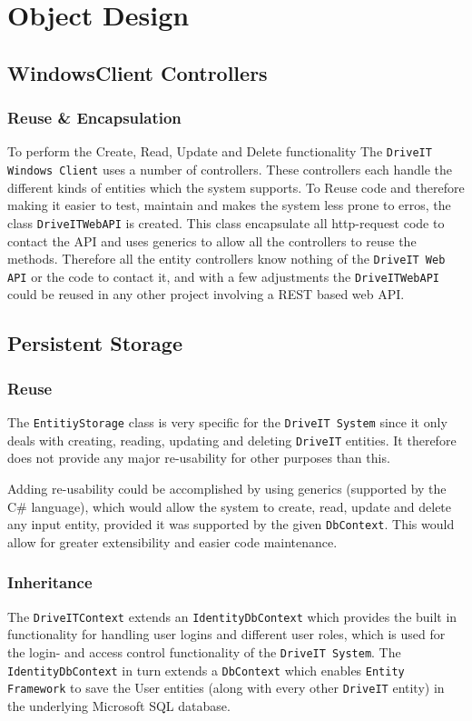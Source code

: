 \section{Object Design}
\subsection{WindowsClient Controllers}
\subsubsection{Reuse \& Encapsulation}
To perform the Create, Read, Update and Delete functionality The \texttt{DriveIT Windows Client} uses a number of controllers. These controllers each handle the different kinds of entities which the system supports. To Reuse code and therefore making it easier to test, maintain and makes the system less prone to erros, the class \texttt{DriveITWebAPI} is created. This class encapsulate all http-request code to contact the API and uses generics to allow all the controllers to reuse the methods. 
Therefore all the entity controllers know nothing of the \texttt{DriveIT Web API} or the code to contact it, and with a few adjustments the \texttt{DriveITWebAPI} could be reused in any other project involving a REST based web API.

\subsection{Persistent Storage}

\subsubsection{Reuse}
The \texttt{EntitiyStorage} class is very specific for the \texttt{DriveIT System} since it only deals with creating, reading, updating and deleting \texttt{DriveIT} entities. It therefore does not provide any major re-usability for other purposes than this. 

Adding re-usability could be accomplished by using generics (supported by the C\# language), which would allow the system to create, read, update and delete any input entity, provided it was supported by the given \texttt{DbContext}. This would allow for greater extensibility and easier code maintenance.

\subsubsection{Inheritance}
The \texttt{DriveITContext} extends an \texttt{IdentityDbContext} which provides the built in functionality for handling user logins and different user roles, which is used for the login- and access control functionality of the \texttt{DriveIT System}.
The \texttt{IdentityDbContext} in turn extends a \texttt{DbContext} which enables \texttt{Entity Framework} to save the User entities (along with every other \texttt{DriveIT} entity) in the underlying Microsoft SQL database.

